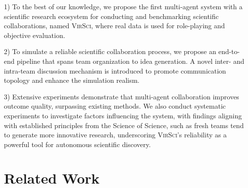 \documentclass[11pt]{article}
\def\modelname{\textsc{VirSci\xspace}}
\begin{document}
1) To the best of our knowledge, we propose the first multi-agent system with a scientific research ecosystem for conducting and benchmarking scientific collaborations, named \modelname, where real data is used for role-playing and objective evaluation.

2) To simulate a reliable scientific collaboration process, we propose an end-to-end pipeline that spans team organization to idea generation. A novel inter- and intra-team discussion mechanism is introduced to promote communication topology and enhance the simulation realism.

3) Extensive experiments demonstrate that multi-agent collaboration improves outcome quality, surpassing existing methods. We also conduct systematic experiments to investigate factors influencing the system, with findings aligning with established principles from the Science of Science, such as fresh teams tend to generate more innovative research, underscoring \modelname's reliability as a powerful tool for autonomous scientific discovery.



\section{Related Work}
\label{sec:related-work}
\end{document}
